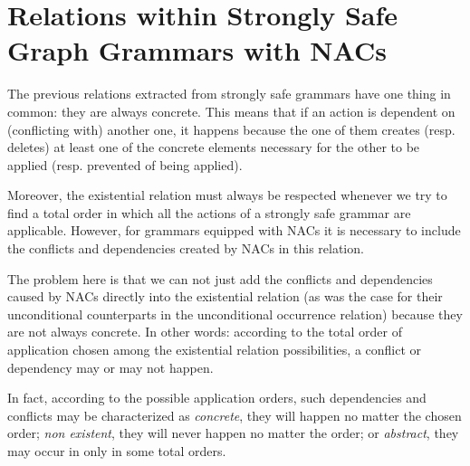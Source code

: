 \section{Relations within Strongly Safe Graph Grammars with NACs}

The previous relations extracted from strongly safe grammars have one thing in common: they are always concrete. This means that if an action is dependent on (conflicting with) another one, it happens because the one of them creates (resp. deletes) at least one of the concrete elements necessary for the other to be applied (resp. prevented of being applied).

Moreover, the existential relation must always be respected whenever we try to find a total order in which all the actions of a strongly safe grammar are applicable. However, for grammars equipped with NACs it is necessary to include the conflicts and dependencies created by NACs in this relation.

The problem here is that we can not just add the conflicts and dependencies caused by NACs directly into the existential relation (as was the case for their unconditional counterparts in the unconditional occurrence relation) because they are not always concrete. In other words: according to the total order of application chosen among the existential relation possibilities, a conflict or dependency may or may not happen.

In fact, according to the possible application orders, such dependencies and conflicts may be characterized as \emph{concrete}, they will happen no matter the chosen order; \emph{non existent}, they will never happen no matter the order; or \emph{abstract}, they may occur in only in some total orders.

